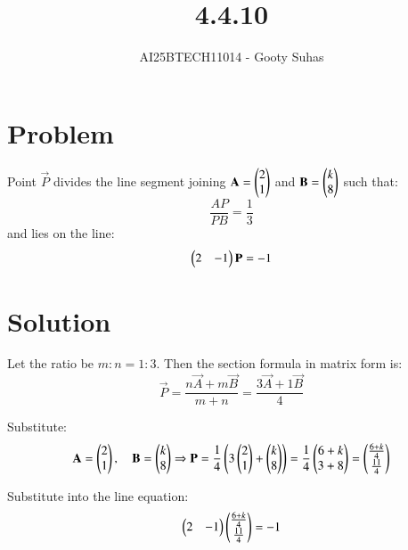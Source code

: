 \documentclass[journal]{IEEEtran}
\begin{document}

\vspace{3cm}

\title{4.4.10}
\author{AI25BTECH11014 - Gooty Suhas}
{\let\newpage\relax\maketitle}

\renewcommand{\thefigure}{\theenumi}
\renewcommand{\thetable}{\theenumi}
\setlength{\intextsep}{10pt}
\renewcommand{\thetable}{\theenumi}

\section*{\large\textbf{Problem}}

Point \( \vec{P} \) divides the line segment joining \( \mathbf{A} = \begin{pmatrix}2 \\ 1\end{pmatrix} \) and \( \mathbf{B} = \begin{pmatrix}k \\ 8\end{pmatrix} \) such that:
\begin{equation}
\frac{AP}{PB} = \frac{1}{3}
\end{equation}
and lies on the line:
\begin{equation}
\begin{pmatrix}2 & -1\end{pmatrix} \mathbf{P} = -1
\end{equation}

\section*{\large\textbf{Solution}}

Let the ratio be \( m:n = 1:3 \).  
Then the section formula in matrix form is:
\begin{equation}
\vec{P} = \frac{n\vec{A} + m\vec{B}}{m + n}
= \frac{3\vec{A} + 1\vec{B}}{4}
\end{equation}

Substitute:
\[
\mathbf{A} = \begin{pmatrix}2 \\ 1\end{pmatrix},\quad \mathbf{B} = \begin{pmatrix}k \\ 8\end{pmatrix}
\Rightarrow
\mathbf{P} = \frac{1}{4} \left( 3 \begin{pmatrix}2 \\ 1\end{pmatrix} + \begin{pmatrix}k \\ 8\end{pmatrix} \right)
= \frac{1}{4} \begin{pmatrix}6 + k \\ 3 + 8\end{pmatrix}
= \begin{pmatrix}\frac{6 + k}{4} \\ \frac{11}{4}\end{pmatrix}
\]

Substitute into the line equation:
\begin{equation}
\begin{pmatrix}2 & -1\end{pmatrix} \begin{pmatrix}\frac{6 + k}{4} \\ \frac{11}{4}\end{pmatrix} = -1
\end{equation}
\end{document}
